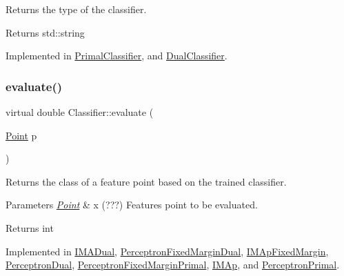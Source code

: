 Returns the type of the classifier. 

\begin{DoxyReturn}{Returns}
std\+::string 
\end{DoxyReturn}


Implemented in \hyperlink{class_primal_classifier_af5117ae286ed7f06430b98f433e9bf62}{Primal\+Classifier}, and \hyperlink{class_dual_classifier_afbede25a3e30b87503c0c6555d52f358}{Dual\+Classifier}.

\mbox{\label{class_classifier_ae8e9554823b85ddc2dcad2955da811d9}} 
\subsubsection{\texorpdfstring{evaluate()}{evaluate()}}
{\footnotesize\ttfamily virtual double Classifier\+::evaluate (\begin{DoxyParamCaption}\item[{\hyperlink{class_point}{Point}}]{p }\end{DoxyParamCaption})\hspace{0.3cm}{\ttfamily [pure virtual]}}



Returns the class of a feature point based on the trained classifier. 


\begin{DoxyParams}{Parameters}
{\em \hyperlink{class_point}{Point}} & x (???) Features point to be evaluated. \\
\hline
\end{DoxyParams}
\begin{DoxyReturn}{Returns}
int 
\end{DoxyReturn}


Implemented in \hyperlink{class_i_m_a_dual_a6e8fe0bee8e37f64de229c3fdf2a20c3}{I\+M\+A\+Dual}, \hyperlink{class_perceptron_fixed_margin_dual_aa7847f8930102f8e1f49ca5e417c7888}{Perceptron\+Fixed\+Margin\+Dual}, \hyperlink{class_i_m_ap_fixed_margin_a97272623213a2bdac41c171fe0522302}{I\+M\+Ap\+Fixed\+Margin}, \hyperlink{class_perceptron_dual_af45407197f22fd513296f7a80e7683d9}{Perceptron\+Dual}, \hyperlink{class_perceptron_fixed_margin_primal_aa24b3bd358a438797c62fa13ef7b8872}{Perceptron\+Fixed\+Margin\+Primal}, \hyperlink{class_i_m_ap_aa0c3b6c105f92e45f38bff680fdb593c}{I\+M\+Ap}, and \hyperlink{class_perceptron_primal_a84b0d3d9627cc21fe9a7770d686e38ea}{Perceptron\+Primal}.

